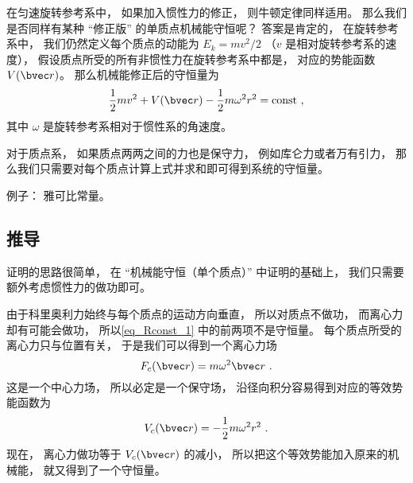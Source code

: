 

在匀速旋转参考系中， 如果加入惯性力的修正， 则牛顿定律同样适用。 那么我们是否同样有某种 “修正版” 的单质点机械能守恒呢？ 答案是肯定的， 在旋转参考系中， 我们仍然定义每个质点的动能为 $E_k = mv^2/2$ （$v$ 是相对旋转参考系的速度）， 假设质点所受的所有非惯性力在旋转参考系中都是， 对应的势能函数 $V(\bvec r)$。 那么机械能修正后的守恒量为
\begin{equation}\label{eq_Rconst_1}
\frac{1}{2}m v^2 + V(\bvec r) - \frac{1}{2}m\omega^2 r^2 = \text{const}~,
\end{equation}
其中 $\omega$ 是旋转参考系相对于惯性系的角速度。

对于质点系， 如果质点两两之间的力也是保守力， 例如库仑力或者万有引力， 那么我们只需要对每个质点计算上式并求和即可得到系统的守恒量。

例子： 雅可比常量。

\subsection{推导}
证明的思路很简单， 在 “机械能守恒（单个质点）” 中证明的基础上， 我们只需要额外考虑惯性力的做功即可。

由于科里奥利力始终与每个质点的运动方向垂直， 所以对质点不做功， 而离心力却有可能会做功， 所以\autoref{eq_Rconst_1} 中的前两项不是守恒量。 每个质点所受的离心力只与位置有关， 于是我们可以得到一个离心力场
\begin{equation}
F_c(\bvec r) = m\omega^2 \bvec r~.
\end{equation}
 这是一个中心力场， 所以必定是一个保守场， 沿径向积分容易得到对应的等效势能函数为
\begin{equation}
V_c(\bvec r) = -\frac{1}{2}m\omega^2 r^2~.
\end{equation}
现在， 离心力做功等于 $V_c(\bvec r)$ 的减小， 所以把这个等效势能加入原来的机械能， 就又得到了一个守恒量。

